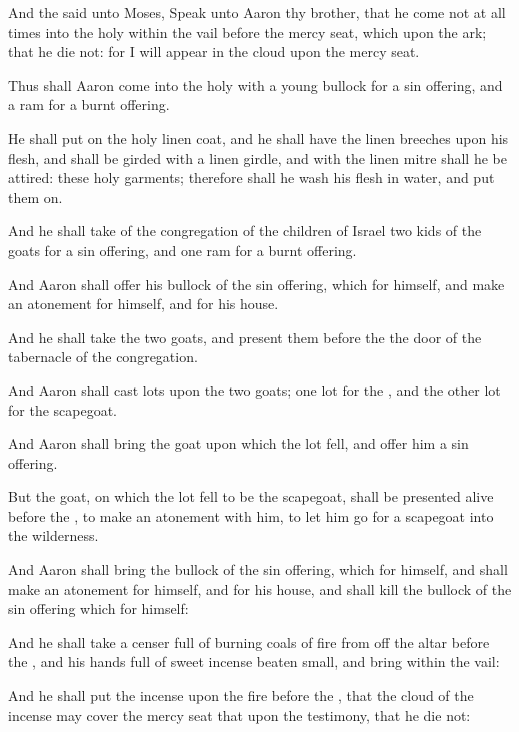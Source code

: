{And the
{}
said unto
Moses,
Speak unto
Aaron thy
brother, that he
come not at all
times into the
holy
{}
within the
vail
before the mercy
seat, which
{} upon the
ark; that he
die not: for I will
appear in the
cloud upon the
mercy seat.

Thus shall
Aaron
come into the
holy
{} with a
young
bullock for a sin
offering, and a
ram for a burnt
offering.

He shall put
on the
holy
linen
coat, and he shall have the
linen
breeches upon his
flesh, and shall be
girded with a
linen
girdle, and with the
linen
mitre shall he be
attired:
these
{}
holy
garments; therefore shall he
wash his
flesh in
water, and
{} put them
on.


\par }{\PP {}And he shall
take of the
congregation of the
children of
Israel
two
kids of the
goats for a sin
offering, and
one
ram for a burnt
offering.

And
Aaron shall
offer his
bullock of the sin
offering, which
{} for
himself, and make an
atonement for himself, and for his
house.

And he shall
take the
two
goats, and
present them
before the
{}
{} the
door of the
tabernacle of the
congregation.

And
Aaron shall
cast
lots upon the
two
goats;
one
lot for the
{}, and the
other
lot for the
scapegoat.

And
Aaron shall
bring the
goat upon which the
{}
lot
fell, and
offer him
{} a sin
offering.

But the
goat, on which the
lot
fell to be the
scapegoat, shall be
presented
alive
before the
{}, to make an
atonement with him,
{} to let him
go for a
scapegoat into the
wilderness.

And
Aaron shall
bring the
bullock of the sin
offering, which
{} for himself, and shall make an
atonement for himself, and for his
house, and shall
kill the
bullock of the sin
offering which
{} for himself:

And he shall
take a
censer
full of
burning
coals of
fire from off the
altar
before the
{}, and his
hands
full of
sweet
incense beaten
small, and
bring
{}
within the
vail:

And he shall
put the
incense upon the
fire
before the
{}, that the
cloud of the
incense may
cover the mercy
seat that
{} upon the
testimony, that he
die not:

}
